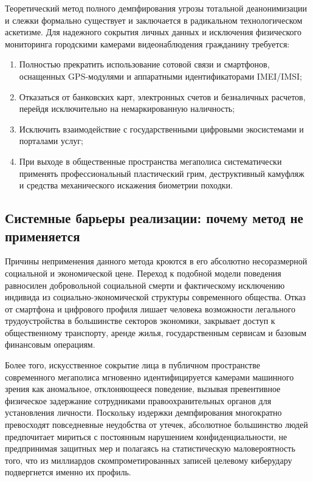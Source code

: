 \documentclass[12pt,a4paper]{article}
\begin{document}
Теоретический метод полного демпфирования угрозы тотальной деанонимизации и слежки формально существует и заключается в радикальном технологическом аскетизме. Для надежного сокрытия личных данных и исключения физического мониторинга городскими камерами видеонаблюдения гражданину требуется:
\begin{enumerate}[leftmargin=2em, itemsep=0.2em]
    \item Полностью прекратить использование сотовой связи и смартфонов, 
    оснащенных GPS-модулями и аппаратными идентификаторами IMEI/IMSI;
    \item Отказаться от банковских карт, электронных счетов и 
    безналичных расчетов, перейдя исключительно на немаркированную 
    наличность;
    \item Исключить взаимодействие с государственными цифровыми 
    экосистемами и порталами услуг;
    \item При выходе в общественные пространства мегаполиса 
    систематически применять профессиональный пластический грим, 
    деструктивный камуфляж и средства механического искажения биометрии 
    походки.
\end{enumerate}

\subsection{Системные барьеры реализации: почему метод не применяется}

Причины неприменения данного метода кроются в его абсолютно 
несоразмерной социальной и экономической цене. Переход к подобной 
модели поведения равносилен добровольной социальной смерти и 
фактическому исключению индивида из социально-экономической структуры 
современного общества. Отказ от смартфона и цифрового профиля лишает 
человека возможности легального трудоустройства в большинстве секторов 
экономики, закрывает доступ к общественному транспорту, аренде жилья, 
государственным сервисам и базовым финансовым операциям. 

Более того, искусственное сокрытие лица в публичном пространстве 
современного мегаполиса мгновенно идентифицируется камерами машинного 
зрения как аномальное, отклоняющееся поведение, вызывая превентивное 
физическое задержание сотрудниками правоохранительных органов для 
установления личности. Поскольку издержки демпфирования многократно 
превосходят повседневные неудобства от утечек, абсолютное большинство 
людей предпочитает мириться с постоянным нарушением конфиденциальности, 
не предпринимая защитных мер и полагаясь на статистическую 
маловероятность того, что из миллиардов скомпрометированных записей 
целевому киберудару подвергнется именно их профиль.
\end{document}
